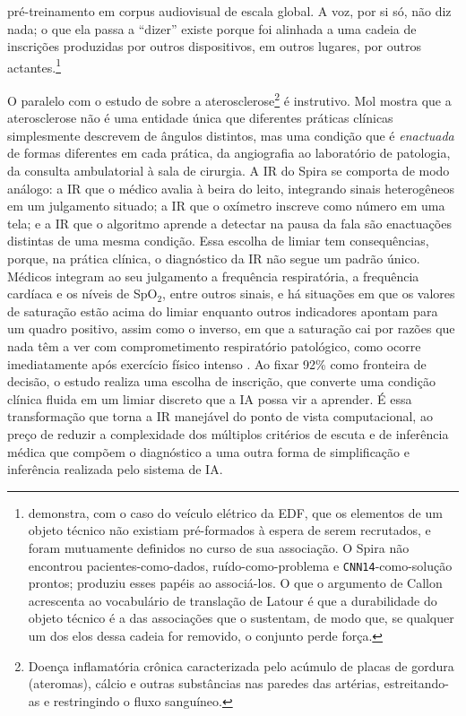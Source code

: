 pré-treinamento em corpus audiovisual de escala global. A voz, por si só, não diz nada; o que ela passa a \enquote{dizer} existe porque foi alinhada a uma cadeia de inscrições produzidas por outros dispositivos, em outros lugares, por outros actantes.\footnote{\textcite{Callon1986Sociology} demonstra, com o caso do veículo elétrico da EDF, que os elementos de um objeto técnico não existiam pré-formados à espera de serem recrutados, e foram mutuamente definidos no curso de sua associação. O Spira não encontrou pacientes-como-dados, ruído-como-problema e \texttt{CNN14}-como-solução prontos; produziu esses papéis ao associá-los. O que o argumento de Callon acrescenta ao vocabulário de translação de Latour é que a durabilidade do objeto técnico é a das associações que o sustentam, de modo que, se qualquer um dos elos dessa cadeia for removido, o conjunto perde força.}

O paralelo com o estudo de \textcite{mol2002body} sobre a aterosclerose\footnote{Doença inflamatória crônica caracterizada pelo acúmulo de placas de gordura (ateromas), cálcio e outras substâncias nas paredes das artérias, estreitando-as e restringindo o fluxo sanguíneo.} é instrutivo. Mol mostra que a aterosclerose não é uma entidade única que diferentes práticas clínicas simplesmente descrevem de ângulos distintos, mas uma condição que é \textit{enactuada} de formas diferentes em cada prática, da angiografia ao laboratório de patologia, da consulta ambulatorial à sala de cirurgia. A IR do Spira se comporta de modo análogo: a IR que o médico avalia à beira do leito, integrando sinais heterogêneos em um julgamento situado; a IR que o oxímetro inscreve como número em uma tela; e a IR que o algoritmo aprende a detectar na pausa da fala são enactuações distintas de uma mesma condição. Essa escolha de limiar tem consequências, porque, na prática clínica, o diagnóstico da IR não segue um padrão único. Médicos integram ao seu julgamento a frequência respiratória, a frequência cardíaca e os níveis de SpO$_2$, entre outros sinais, e há situações em que os valores de saturação estão acima do limiar enquanto outros indicadores apontam para um quadro positivo, assim como o inverso, em que a saturação cai por razões que nada têm a ver com comprometimento respiratório patológico, como ocorre imediatamente após exercício físico intenso \parencite{Gauy2024Discriminant}. Ao fixar 92\% como fronteira de decisão, o estudo realiza uma escolha de inscrição, que converte uma condição clínica fluida em um limiar discreto que a IA possa vir a aprender. É essa transformação que torna a IR manejável do ponto de vista computacional, ao preço de reduzir a complexidade dos múltiplos critérios de escuta e de inferência médica que compõem o diagnóstico a uma outra forma de simplificação e inferência realizada pelo sistema de IA.

